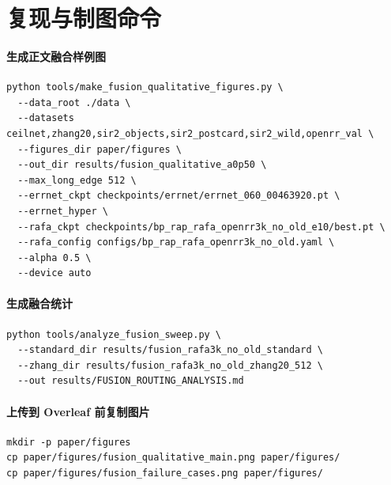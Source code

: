 \documentclass{article}
\begin{document}
\appendix

\section{复现与制图命令}

\paragraph{生成正文融合样例图}
\begin{verbatim}
python tools/make_fusion_qualitative_figures.py \
  --data_root ./data \
  --datasets ceilnet,zhang20,sir2_objects,sir2_postcard,sir2_wild,openrr_val \
  --figures_dir paper/figures \
  --out_dir results/fusion_qualitative_a0p50 \
  --max_long_edge 512 \
  --errnet_ckpt checkpoints/errnet/errnet_060_00463920.pt \
  --errnet_hyper \
  --rafa_ckpt checkpoints/bp_rap_rafa_openrr3k_no_old_e10/best.pt \
  --rafa_config configs/bp_rap_rafa_openrr3k_no_old.yaml \
  --alpha 0.5 \
  --device auto
\end{verbatim}

\paragraph{生成融合统计}
\begin{verbatim}
python tools/analyze_fusion_sweep.py \
  --standard_dir results/fusion_rafa3k_no_old_standard \
  --zhang_dir results/fusion_rafa3k_no_old_zhang20_512 \
  --out results/FUSION_ROUTING_ANALYSIS.md
\end{verbatim}

\paragraph{上传到 Overleaf 前复制图片}
\begin{verbatim}
mkdir -p paper/figures
cp paper/figures/fusion_qualitative_main.png paper/figures/
cp paper/figures/fusion_failure_cases.png paper/figures/
\end{verbatim}
\end{document}
